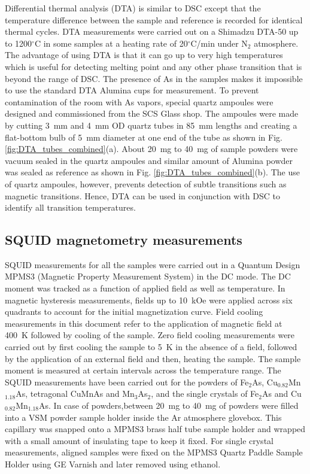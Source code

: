 \documentclass[10pt,doublespacing,edeposit]{uiucthesis2020}
\begin{document}
\begin{mainmatter}
Differential thermal analysis (DTA) is similar to DSC except that the temperature difference between the sample and reference is recorded for identical thermal cycles. DTA measurements were carried out on a Shimadzu DTA-50 up to 1200$^\circ$C in some samples at a heating rate of 20$^\circ$C/min under N$_2$ atmosphere. The advantage of using DTA is that it can go up to very high temperatures which is useful for detecting melting point and any other phase transition that is beyond the range of DSC. The presence of As in the samples makes it impossible to use the standard DTA Alumina cups for measurement. To prevent contamination of the room with As vapors, special quartz ampoules were designed and commissioned from the SCS Glass shop. The ampoules were made by cutting 3~mm and 4~mm OD quartz tubes in 85~mm lengths and creating a flat-bottom bulb of 5~mm diameter at one end of the tube as shown in Fig. \ref{fig:DTA_tubes_combined}(a). About 20~mg to 40~mg of sample powders were vacuum sealed in the quartz ampoules and similar amount of Alumina powder was sealed as reference as shown in Fig. \ref{fig:DTA_tubes_combined}(b). The use of quartz ampoules, however, prevents detection of subtle transitions such as magnetic transitions. Hence, DTA can be used in conjunction with DSC to identify all transition temperatures.

\subsection{SQUID magnetometry measurements}

SQUID measurements for all the samples were carried out in a Quantum Design MPMS3 (Magnetic Property Measurement System) in the DC mode. The DC moment was tracked as a function of applied field as well as temperature. In magnetic hysteresis measurements, fields up to 10~kOe were applied across six quadrants to account for the initial magnetization curve. Field cooling measurements in this document refer to the application of magnetic field at 400~K followed by cooling of the sample. Zero field cooling measurements were carried out by first cooling the sample to 5~K in the absence of a field, followed by the application of an external field and then, heating the sample. The sample moment is measured at certain intervals across the temperature range. The SQUID measurements have been carried out for the powders of Fe$_2$As, Cu$_{0.82}$Mn$_{1.18}$As, tetragonal CuMnAs and Mn$_3$As$_2$, and the single crystals of Fe$_2$As and Cu$_{0.82}$Mn$_{1.18}$As. In case of powders,between 20~mg to 40~mg of powders were filled into a VSM powder sample holder inside the Ar atmosphere glovebox. This capillary was snapped onto a MPMS3 brass half tube sample holder and wrapped with a small amount of insulating tape to keep it fixed. For single crystal measurements, aligned samples were fixed on the MPMS3 Quartz Paddle Sample Holder using GE Varnish and later removed using ethanol.



\end{mainmatter}
\end{document}
